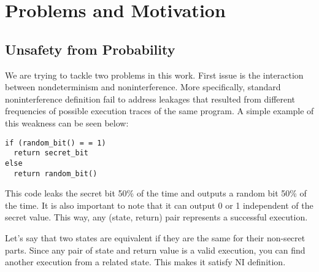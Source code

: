 \section{Problems and Motivation}
\subsection{Unsafety from Probability}
We are trying to tackle two problems in this work. First issue is the interaction between nondeterminism and noninterference. More specifically, standard noninterference definition fail to address leakages that resulted from different frequencies of possible execution traces of the same program. A simple example of this weakness can be seen below: 


\begin{lstlisting}
if (random_bit() = = 1)
  return secret_bit
else
  return random_bit()
\end{lstlisting}

This code leaks the secret bit 50\% of the time and outputs a random bit 50\% of the time. It is also important to note that it can output 0 or 1 independent of the secret value. This way, any (state, return) pair represents a successful execution. 

Let's say that two states are equivalent if they are the same for their non-secret parts. Since any pair of state and return value is a valid execution, you can find another execution from a related state. This makes it satisfy NI definition.

\begin{comment}
Here is a table for all possible ways an execution of above function could go:\\

\begin{tabular}{| c | c | c | c | c |}
	\hline
	 & Secret Bit & First Random Bit & Output & Noninterfering Execution \\
	\hline
	a &	0 & 0 & 0 & d \\
	\hline
	b &	0 & 0 & 1 & e \\
	\hline
	c &	0 & 1 & 0 & d \\
	\hline
	\hline
	d &	1 & 0 & 0 & a \\
	\hline
	e &	1 & 0 & 1 & b \\
	\hline
	f &	1 & 1 & 1 & b \\
	\hline
\end{tabular}\\

For each state and an execution from it, there is a corresponding execution from each related state with same return value. If a related state has same secret bit value, first execution is also the second execution. If a related state has opposite secret bit value, then corresponding execution is given in the above table. This demonstrates how given code snippet satisfies NI.
\end{comment}


